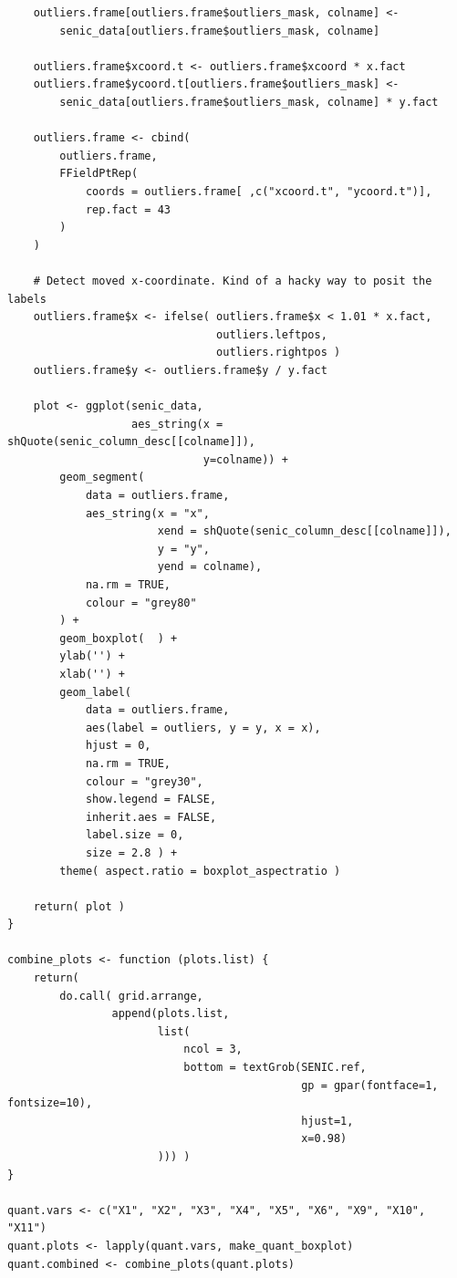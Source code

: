 \documentclass[11pt]{article}
\begin{document}
\begin{lstlisting}
    outliers.frame[outliers.frame$outliers_mask, colname] <-
        senic_data[outliers.frame$outliers_mask, colname]

    outliers.frame$xcoord.t <- outliers.frame$xcoord * x.fact
    outliers.frame$ycoord.t[outliers.frame$outliers_mask] <-
        senic_data[outliers.frame$outliers_mask, colname] * y.fact

    outliers.frame <- cbind(
        outliers.frame,
        FFieldPtRep(
            coords = outliers.frame[ ,c("xcoord.t", "ycoord.t")],
            rep.fact = 43
        )
    )

    # Detect moved x-coordinate. Kind of a hacky way to posit the labels
    outliers.frame$x <- ifelse( outliers.frame$x < 1.01 * x.fact,
                                outliers.leftpos,
                                outliers.rightpos )
    outliers.frame$y <- outliers.frame$y / y.fact

    plot <- ggplot(senic_data,
                   aes_string(x = shQuote(senic_column_desc[[colname]]),
                              y=colname)) +
        geom_segment(
            data = outliers.frame,
            aes_string(x = "x",
                       xend = shQuote(senic_column_desc[[colname]]),
                       y = "y",
                       yend = colname),
            na.rm = TRUE,
            colour = "grey80"
        ) +
        geom_boxplot(  ) +
        ylab('') +
        xlab('') +
        geom_label(
            data = outliers.frame,
            aes(label = outliers, y = y, x = x),
            hjust = 0,
            na.rm = TRUE,
            colour = "grey30",
            show.legend = FALSE,
            inherit.aes = FALSE,
            label.size = 0,
            size = 2.8 ) +
        theme( aspect.ratio = boxplot_aspectratio )

    return( plot )
}

combine_plots <- function (plots.list) {
    return(
        do.call( grid.arrange,
                append(plots.list,
                       list(
                           ncol = 3,
                           bottom = textGrob(SENIC.ref,
                                             gp = gpar(fontface=1, fontsize=10),
                                             hjust=1,
                                             x=0.98)
                       ))) )
}

quant.vars <- c("X1", "X2", "X3", "X4", "X5", "X6", "X9", "X10", "X11")
quant.plots <- lapply(quant.vars, make_quant_boxplot)
quant.combined <- combine_plots(quant.plots)


\end{lstlisting}
\end{document}
